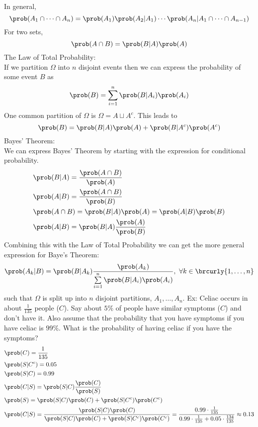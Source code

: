 In general,
\[\prob(A_1\cap\cdots\cap A_n)=\prob(A_1)\prob(A_2|A_1)\cdots\prob(A_n|A_1\cap\cdots\cap A_{n-1})\]
For two sets,
\[\prob(A\cap B)=\prob(B|A)\prob(A)\]
The Law of Total Probability:\\
If we partition $\Omega$ into $n$ disjoint events then we can express the probability of some event $B$ as
\[\prob(B)=\sum_{i=1}^n \prob(B|A_i)\prob(A_i)\]
One common partition of $\Omega$ is $\Omega=A\sqcup A^c$. This leads to
\[\prob(B)=\prob(B|A)\prob(A)+\prob(B|A^c)\prob(A^c)\]
Bayes' Theorem:\\
We can express Bayes' Theorem by starting with the expression for conditional probability.
\begin{align*}
    &\prob(B|A)=\frac{\prob(A\cap B)}{\prob(A)}\\
    &\prob(A|B)=\frac{\prob(A\cap B)}{\prob(B)}\\
    &\prob(A\cap B)=\prob(B|A)\prob(A)=\prob(A|B)\prob(B)\\
    &\prob(A|B)=\prob(B|A)\frac{\prob(A)}{\prob(B)}
\end{align*}
Combining this with the Law of Total Probability we can get the more general expression for Baye's Theorem:
$$\prob(A_k|B)=\prob(B|A_k)\frac{\prob(A_k)}{\sum\limits_{i=1}^n\prob(B|A_i)\prob(A_i)},\ \forall k\in \brcurly{1,\ldots,n}$$
such that $\Omega$ is split up into $n$ disjoint partitions, $A_1,\ldots,A_n$.
Ex: Celiac occurs in about $\frac{1}{135}$ people ($C$). Say about $5\%$ of people have similar symptoms ($C$) and don't have it. Also assume that the probability that you have symptoms if you have celiac is $99\%$. What is the probability of having celiac if you have the symptoms?
\begin{align*}
    &\prob(C)=\frac{1}{135}\\
    &\prob(S|C^c)=0.05\\
    &\prob(S|C)=0.99\\
    &\prob(C|S)=\prob(S|C)\frac{\prob(C)}{\prob(S)}\\
    &\prob(S)=\prob(S|C)\prob(C)+\prob(S|C^c)\prob(C^c)\\
    &\prob(C|S)=\frac{\prob(S|C)\prob(C)}{\prob(S|C)\prob(C)+\prob(S|C^c)\prob(C^c)}=\frac{0.99\cdot\frac{1}{135}}{0.99\cdot\frac{1}{135}+0.05\cdot\frac{134}{135}}\approx0.13
\end{align*}

